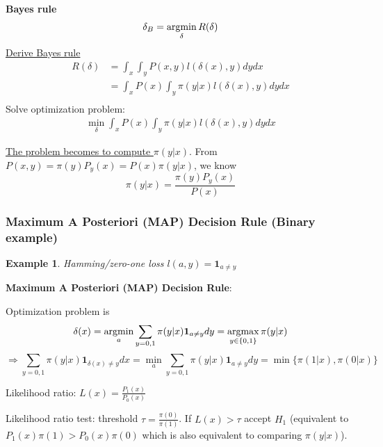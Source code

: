 \documentclass[11pt,a4paper]{article}
\newcommand{\argmax}{\operatornamewithlimits{argmax}}
\newcommand{\argmin}{\operatornamewithlimits{argmin}}
\newtheorem{example}{Example}
\begin{document}
\textbf{Bayes rule}
$$\delta_B=\argmin_\delta R(\delta)$$
\underline{Derive Bayes rule}
\begin{equation}
    \begin{aligned}
        R(\delta)&=\int_x\int_y P(x,y) l(\delta(x),y) dy dx\\
        &=\int_x P(x)\int_y \pi(y|x) l(\delta(x),y) dy dx\\
    \end{aligned}
    \nonumber
\end{equation}
Solve optimization problem:
\begin{equation}
    \begin{aligned}
        \min_\delta \int_x P(x)\int_y \pi(y|x) l(\delta(x),y) dy dx
    \end{aligned}
    \nonumber
\end{equation}
\begin{center}
\end{center}
\underline{The problem becomes to compute $\pi(y|x)$}. From $P(x,y)=\pi(y)P_y(x)=P(x)\pi(y|x)$, we know $$\pi(y|x)=\frac{\pi(y)P_y(x)}{P(x)}$$

\subsubsection{Maximum A Posteriori (MAP) Decision Rule (Binary example)}
\begin{example}
    Hamming/zero-one loss $l(a,y)=\mathbf{1}_{a\neq y}$
\end{example}

\textbf{Maximum A Posteriori (MAP) Decision Rule}:

Optimization problem is $$\delta(x)=\argmin_{a} \sum_{y=0,1} \pi(y|x) \mathbf{1}_{a\neq y} dy=\argmax_{y\in\{0,1\}}\pi(y|x)$$
$$\Rightarrow \sum_{y=0,1} \pi(y|x) \mathbf{1}_{\delta(x)\neq y} dx=\min_{a} \sum_{y=0,1} \pi(y|x) \mathbf{1}_{a\neq y} dy=\min\{\pi(1|x),\pi(0|x)\}$$

Likelihood ratio: $L(x)=\frac{P_1(x)}{P_0(x)}$

Likelihood ratio test: threshold $\tau=\frac{\pi(0)}{\pi(1)}$. If $L(x)>\tau$ accept $H_1$ (equivalent to $P_1(x)\pi(1)>P_0(x)\pi(0)$ which is also equivalent to comparing $\pi(y|x)$).
\end{document}
